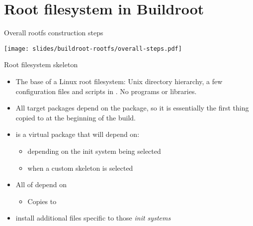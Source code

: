 
\section{Root filesystem in Buildroot}

\begin{frame}{Overall rootfs construction steps}
  \begin{center}
    \texttt{[image: slides/buildroot-rootfs/overall-steps.pdf]}
  \end{center}
\end{frame}

\begin{frame}{Root filesystem skeleton}
  \begin{itemize}
  \item The base of a Linux root filesystem: Unix directory hierarchy,
    a few configuration files and scripts in . No programs
    or libraries.
  \item All target packages depend on the
     package, so it is essentially the first thing copied
    to  at the beginning of the build.
  \item {} is a virtual package that will depend on:
    \begin{itemize}
    \item {} depending on the
      init system being selected
    \item {} when a custom skeleton is selected
    \end{itemize}
  \item All of  depend on
    \begin{itemize}
    \item Copies  to 
    \end{itemize}
  \item {} install additional files
    specific to those {\em init systems}
  \end{itemize}
\end{frame}

